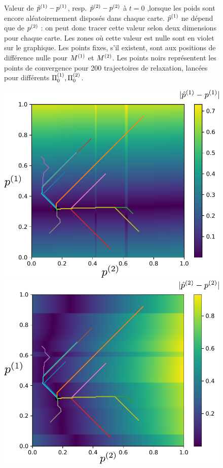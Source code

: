 \documentclass[../main]{subfiles}
\begin{document}
\begin{figure}
\begin{minipage}{0.5\textwidth}
\end{minipage}
\caption{Valeur de ${\hat{p}}^{({1})} - p^{({1})}$, resp. ${\hat{p}}^{({2})} - p^{({2})}$ à $t=0$ ,lorsque les poids sont encore aléatoiremement disposés dans chaque carte.
 ${\hat{p}}^{({1})}$ ne dépend que de $p^{({2})}$ : on peut donc tracer cette valeur selon deux dimensions pour chaque carte. Les zones où cette valeur est nulle sont en violet sur le graphique. Les points fixes, s'il existent, sont aux positions de différence nulle pour $M^{({1})}$ et $M^{({2})}$. Les points noirs représentent les points de convergence pour 200 trajectoires de relaxation, lancées pour différents $\Pi_0^{({1})}, \Pi_0^{({2})}$.}
 
\label{fig:diff_relax_t1_notraj}
\end{figure}

\begin{figure}
\begin{minipage}{0.5\textwidth}
\centering
\includegraphics[width=\textwidth]{champ_X_006.pdf}
\end{minipage}
\begin{minipage}{0.5\textwidth}
\centering
\includegraphics[width=\textwidth]{champ_Y_006.pdf}

\end{minipage}
\end{figure}
\end{document}
